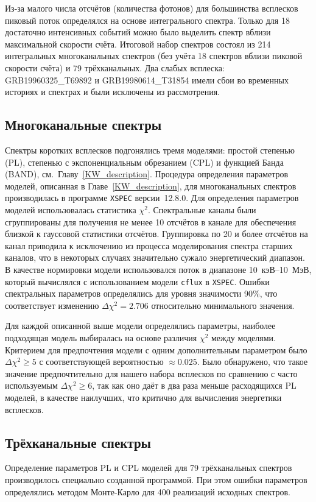 Из-за малого числа отсчётов (количества фотонов) для большинства всплесков 
пиковый поток определялся на основе интегрального спектра. 
Только для 18 достаточно интенсивных событий можно было выделить спектр вблизи 
максимальной скорости счёта.
Итоговой набор спектров состоял из 214 интегральных многоканальных спектров 
(без учёта 18 спектров вблизи пиковой скорости счёта) и 79 трёхканальных. 
Два слабых всплеска: GRB19960325\_T69892 и GRB19980614\_T31854 имели сбои во 
временных историях и спектрах и были исключены из рассмотрения.

\subsection{Многоканальные спектры}
Спектры коротких всплесков подгонялись тремя моделями: простой степенью (PL), степенью с экспоненциальным 
обрезанием (CPL) и функцией Банда (BAND), см.~Главу~\ref{KW_description}.
Процедура определения параметров моделей, описанная в Главе~\ref{KW_description}, 
для многоканальных спектров производилась в программе 
\texttt{XSPEC}\citep{Arnaud_1996ASPC} версии~12.8.0.
Для определения параметров моделей использовалась статистика $\chi^2$. 
Спектральные каналы были сгруппированы для получения не менее 10 отсчётов в канале для обеспечения 
близкой к гауссовой статистики отсчётов. Группировка по 20 и более отсчётов на канал 
приводила к исключению из процесса моделирования спектра старших каналов, 
что в некоторых случаях значительно сужало энергетический диапазон. 
В качестве нормировки модели использовался поток в диапазоне 10~кэВ--10~МэВ, 
который вычислялся с использованием модели \texttt{cflux} в \texttt{XSPEC}.
Ошибки спектральных параметров определялись для уровня 
значимости 90\%, что соответствует изменению $\Delta \chi^2 = 2.706$ относительно
минимального значения.

Для каждой описанной выше модели определялись параметры, наиболее подходящая 
модель выбиралась на основе различия $\chi^2$ между моделями. Критерием для предпочтения
модели с одним дополнительным параметром было $\Delta \chi^2 \geq 5$ с соответствующей 
вероятностью $\approx 0.025$. Было обнаружено, что такое значение предпочтительно 
для нашего набора всплесков по сравнению с часто используемым $\Delta \chi^2 \geq 6$,
так как оно даёт в два раза меньше расходящихся PL моделей, в качестве наилучших,
что критично для вычисления энергетики всплесков.

\subsection{Трёхканальные спектры}
Определение параметров PL и CPL моделей для 79 трёхканальных спектров производилось 
специально созданной программой. При этом ошибки параметров определялись методом Монте-Карло
для 400 реализаций исходных спектров.

